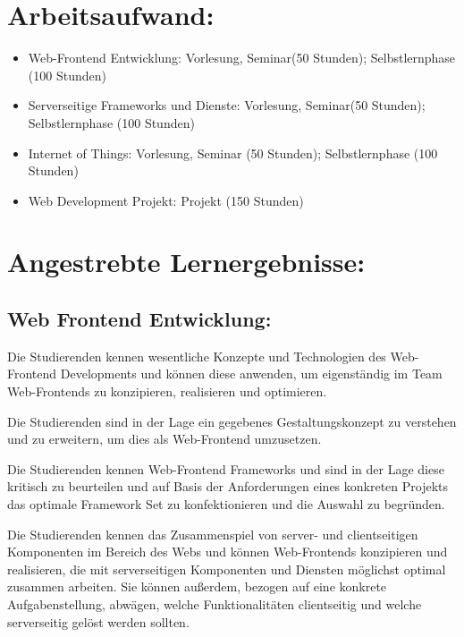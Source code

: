 \section*{Arbeitsaufwand:}\label{arbeitsaufwand-25}

\begin{itemize}
\tightlist
\item
  Web-Frontend Entwicklung: Vorlesung, Seminar(50 Stunden);
  Selbstlernphase (100 Stunden)
\item
  Serverseitige Frameworks und Dienste: Vorlesung, Seminar(50 Stunden);
  Selbstlernphase (100 Stunden)
\item
  Internet of Things: Vorlesung, Seminar (50 Stunden); Selbstlernphase
  (100 Stunden)
\item
  Web Development Projekt: Projekt (150 Stunden)
\end{itemize}

\section*{Angestrebte
Lernergebnisse:}\label{angestrebte-lernergebnisse-26}

\subsection*{Web Frontend
Entwicklung:}\label{web-frontend-entwicklung}

Die Studierenden kennen wesentliche Konzepte und Technologien des
Web-Frontend Developments und können diese anwenden, um eigenständig im
Team Web-Frontends zu konzipieren, realisieren und optimieren.

Die Studierenden sind in der Lage ein gegebenes Gestaltungskonzept zu
verstehen und zu erweitern, um dies als Web-Frontend umzusetzen.

Die Studierenden kennen Web-Frontend Frameworks und sind in der Lage
diese kritisch zu beurteilen und auf Basis der Anforderungen eines
konkreten Projekts das optimale Framework Set zu konfektionieren und die
Auswahl zu begründen.

Die Studierenden kennen das Zusammenspiel von server- und clientseitigen
Komponenten im Bereich des Webs und können Web-Frontends konzipieren und
realisieren, die mit serverseitigen Komponenten und Diensten möglichst
optimal zusammen arbeiten. Sie können außerdem, bezogen auf eine
konkrete Aufgabenstellung, abwägen, welche Funktionalitäten clientseitig
und welche serverseitig gelöst werden sollten.

